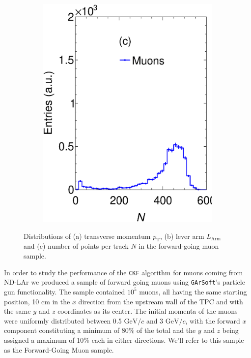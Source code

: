 \begin{figure}[t]
\begin{subfigure}[b]{0.32\textwidth}
         \includegraphics[width=\textwidth]{figures/ch5-KF_NDGAr/FullSample/PGun/Props/NTallpgun.eps}
         \caption{}
         \label{fig:NTPC_PGun}
     \end{subfigure}
        \caption[Distributions for some key quantities related to the tracks in the forward-going muon sample.]{Distributions of (a) transverse momentum $p_{\textrm{T}}$,  (b) lever arm $L_{\textrm{Arm}}$ and (c) number of points per track $N$ in the forward-going muon sample.} \label{fig:TPCProperties_PGun}
\end{figure}

In order to study the performance of the \texttt{CKF} algorithm for muons coming from ND-LAr we produced a sample of forward going muons using \texttt{GArSoft}'s particle gun functionality. The sample contained $10^5$ muons, all having the same starting position, 10 cm in the $x$ direction from the upstream wall of the TPC and with the same $y$ and $z$ coordinates as its center. The initial momenta of the muons were uniformly distributed between 0.5 $\textrm{GeV}/c$ and 3 $\textrm{GeV}/c$, with the forward $x$ component constituting a minimum of 80\% of the total and the $y$ and $z$ being assigned a maximum of 10\% each in either directions. We'll refer to this sample as the Forward-Going Muon sample.

